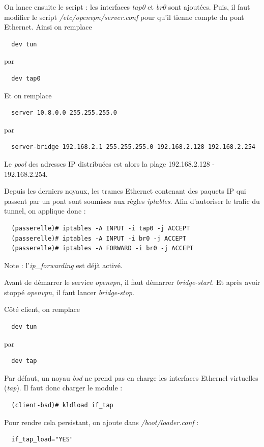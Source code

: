 \documentclass[a4paper]{article}
\begin{document}
On lance ensuite le script : les interfaces \textit{tap0} et \textit{br0} sont ajoutées.
Puis, il faut modifier le script \textit{/etc/openvpn/server.conf} pour qu'il tienne 
compte du pont Ethernet.
Ainsi on remplace
\begin{verbatim}
  dev tun
\end{verbatim}
par
\begin{verbatim}
  dev tap0
\end{verbatim}

Et on remplace
\begin{verbatim}
  server 10.8.0.0 255.255.255.0
\end{verbatim}
par
\begin{verbatim}
  server-bridge 192.168.2.1 255.255.255.0 192.168.2.128 192.168.2.254
\end{verbatim}

Le \textit{pool} des adresses IP distribuées est alors la plage 192.168.2.128 - 192.168.2.254.

Depuis les derniers noyaux, les trames Ethernet contenant des paquets IP qui passent
par un pont sont soumises aux règles \textit{iptables}.
Afin d'autoriser le trafic du tunnel, on applique donc :
\begin{verbatim}
  (passerelle)# iptables -A INPUT -i tap0 -j ACCEPT
  (passerelle)# iptables -A INPUT -i br0 -j ACCEPT
  (passerelle)# iptables -A FORWARD -i br0 -j ACCEPT
\end{verbatim}
Note : l'\textit{ip\_forwarding} est déjà activé.

Avant de démarrer le service \textit{openvpn}, il faut démarrer \textit{bridge-start}.
Et après avoir stoppé \textit{openvpn}, il faut lancer \textit{bridge-stop}.

Côté client, on remplace
\begin{verbatim}
  dev tun
\end{verbatim}
par
\begin{verbatim}
  dev tap
\end{verbatim}

Par défaut, un noyau \textit{bsd} ne prend pas en charge les interfaces Ethernel virtuelles (\textit{tap}).
Il faut donc charger le module :
\begin{verbatim}
  (client-bsd)# kldload if_tap
\end{verbatim}

Pour rendre cela persistant, on ajoute dans \textit{/boot/loader.conf} :
\begin{verbatim}
  if_tap_load="YES"
\end{verbatim}
\end{document}
